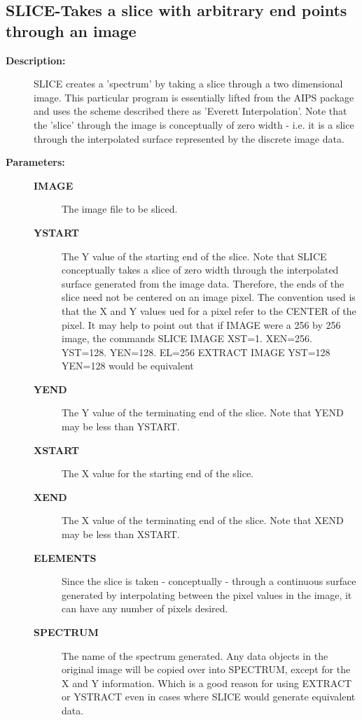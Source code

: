 \subsection{SLICE-\label{SLICE}Takes a slice with arbitrary end points through an image}
\begin{description}

\item [\textbf{Description:}]
 SLICE creates a 'spectrum' by taking a slice through a two
 dimensional image.  This particular program is essentially
 lifted from the AIPS package and uses the scheme described
 there as 'Everett Interpolation'.  Note that the 'slice'
 through the image is conceptually of zero width - i.e. it
 is a slice through the interpolated surface represented by
 the discrete image data.

\item [\textbf{Parameters:}]
\begin{description}
\item [\textbf{IMAGE}]
 The image file to be sliced.
\item [\textbf{YSTART}]
 The Y value of the starting end of
 the slice.  Note that SLICE conceptually takes a slice
 of zero width through the interpolated surface generated
 from the image data.  Therefore, the ends of the slice
 need not be centered on an image pixel.  The convention
 used is that the X and Y values ued for a pixel refer to
 the CENTER of the pixel.  It may help to point out that
 if IMAGE were a 256 by 256 image, the commands
 SLICE IMAGE XST=1. XEN=256. YST=128. YEN=128. EL=256
 EXTRACT IMAGE YST=128 YEN=128    would be equivalent
\item [\textbf{YEND}]
 The Y value of the terminating end of the slice.
 Note that YEND may be less than YSTART.
\item [\textbf{XSTART}]
 The X value for the starting end of the slice.
\item [\textbf{XEND}]
 The X value of the terminating end of the slice.
 Note that XEND may be less than XSTART.
\item [\textbf{ELEMENTS}]
 Since the slice is taken - conceptually - through a
 continuous surface generated by interpolating between the
 pixel values in the image, it can have any number of pixels
 desired.
\item [\textbf{SPECTRUM}]
 The name of the spectrum generated.  Any
 data objects in the original image will be copied over
 into SPECTRUM, except for the X and Y information. Which
 is a good reason for using EXTRACT or YSTRACT even in
 cases where SLICE would generate equivalent data.
\end{description}


\end{description}
